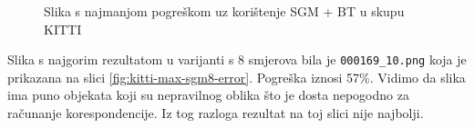 \documentclass[utf8, zavrsni, numeric]{fer}
\begin{document}
\begin{figure}[H]
  \centering
  
  \centering

  \centering

  \caption{Slika s najmanjom pogreškom uz korištenje SGM + BT u skupu KITTI}
\end{figure}

Slika s najgorim rezultatom u varijanti s 8 smjerova bila je {\verb|000169_10.png|} koja je prikazana na slici \ref{fig:kitti-max-sgm8-error}. Pogreška iznosi 57\%. Vidimo da slika ima puno objekata koji su
nepravilnog oblika što je dosta nepogodno za računanje korespondencije. Iz tog razloga rezultat na toj slici nije najbolji.
\end{document}

